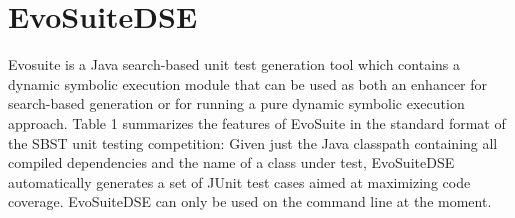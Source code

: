 \documentclass[conference]{IEEEtran}
\begin{document}



\section{EvoSuiteDSE}

Evosuite is a Java search-based unit test generation tool \cite{evosuite} which contains a dynamic symbolic execution module that can be used as both an enhancer for search-based generation \cite{ImprovingSBSTWithDSE} or for running a pure dynamic symbolic execution approach. Table 1 summarizes the features of EvoSuite in the standard format of the SBST unit testing competition: Given just the Java classpath containing all compiled dependencies and the name of a class under test, EvoSuiteDSE automatically generates a set of JUnit test cases aimed at maximizing code coverage. EvoSuiteDSE can only be used on the command line at the moment.
\end{document}
